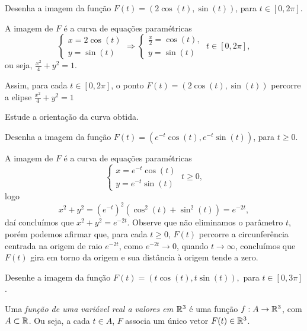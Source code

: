 \begin{example}
    Desenha a imagem da função \(F(t) = (2\cos(t),\sin(t))\), para \(t\in[0,2\pi]\).

    A imagem de \(F\) é a curva de equações paramétricas \[\begin{cases}
        x = 2\cos(t)\\
        y = \sin(t)
    \end{cases} \Rightarrow \begin{cases}
        \frac{x}{2} = \cos(t),\\
        y = \sin(t)
    \end{cases}\; t\in[0,2\pi],\] ou seja, \(\frac{x^2}{4} + y^2 = 1\).

    Assim, para cada \(t\in[0,2\pi]\), o ponto \(F(t) = (2\cos(t),\sin(t))\) percorre a elipse \(\frac{x^2}{4} + y^2 = 1\) %

    \begin{exercise}
        Estude a orientação da curva obtida.
    \end{exercise}
\end{example}

\begin{example}
    Desenha a imagem da função \(F(t) = (e^{-t}\cos(t),e^{-t}\sin(t))\), para \(t\geq 0\).

    A imagem de \(F\) é a curva de equações paramétricas \[\begin{cases}
        x = e^{-t}\cos(t) \\
        y = e^{-t}\sin(t)
    \end{cases}\; t\geq 0,\] logo \[x^2 + y^2 = (e^{-t})^2(\cos^2(t) + \sin^2(t)) = e^{-2t},\] daí concluímos que \(x^2 + y^2 = e^{-2t}\). Observe que não eliminamos o parâmetro \(t\), porém podemos afirmar que, para cada \(t\geq 0\), \(F(t)\) percorre a circunferência centrada na origem de raio \(e^{-2t}\), como \(e^{-2t}\to 0\), quando \(t\to\infty\), concluímos que \(F(t)\) gira em torno da origem e sua distância à origem tende a zero.%
\end{example}

\begin{exercise}
    Desenhe a imagem da função \(F(t) = (t\cos(t),t\sin(t)),\) para \(t\in[0,3\pi]\).
\end{exercise}

\begin{definition}
    Uma \textit{função de uma variável real a valores em } \(\mathbb{R}^3\)\label{Curva em R^3} é uma função \(f: A \to \mathbb{R}^3\), com \(A\subset\mathbb{R}\). Ou seja, a cada \(t\in A\), \(F\) associa um único vetor \(F(t) \in\mathbb{R}^3\). %
\end{definition}

